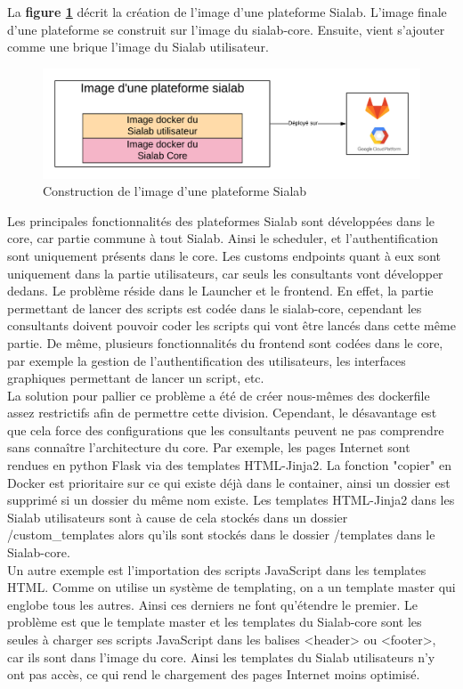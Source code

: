 \documentclass{article} %
\begin{document}
La \textbf{figure \ref{fig:siasia}} décrit la création de l'image d'une plateforme Sialab. L'image finale d'une plateforme se construit sur l'image du sialab-core. Ensuite, vient s'ajouter comme une brique l'image du Sialab utilisateur. 
\begin{figure}[!h]
 \centering
 \includegraphics[keepaspectratio = true,scale=0.6]{sia-core.png}
 \caption{Construction de l'image d'une plateforme Sialab}
 \label{fig:siasia}
\end{figure}

Les principales fonctionnalités des plateformes Sialab sont développées dans le core, car partie commune à tout Sialab. Ainsi le scheduler, et l'authentification sont uniquement présents dans le core. Les customs endpoints quant à eux sont uniquement dans la partie utilisateurs, car seuls les consultants vont développer dedans. Le problème réside dans le Launcher et le frontend. En effet, la partie permettant de lancer des scripts est codée dans le sialab-core, cependant les consultants doivent pouvoir coder les scripts qui vont être lancés dans cette même partie. De même, plusieurs fonctionnalités du frontend sont codées dans le core, par exemple la gestion de l'authentification des utilisateurs, les interfaces graphiques permettant de lancer un script, etc.\\

La solution pour pallier ce problème a été de créer nous-mêmes des dockerfile assez restrictifs afin de permettre cette division. Cependant, le désavantage est que cela force des configurations que les consultants peuvent ne pas comprendre sans connaître l'architecture du core. Par exemple, les pages Internet sont rendues en python Flask via des templates HTML-Jinja2. La fonction "copier" en Docker est prioritaire sur ce qui existe déjà dans le container, ainsi un dossier est supprimé si un dossier du même nom existe. Les templates HTML-Jinja2 dans les Sialab utilisateurs sont à cause de cela stockés dans un dossier /custom\_templates alors qu'ils sont stockés dans le dossier /templates dans le Sialab-core.\\
Un autre exemple est l'importation des scripts JavaScript dans les templates HTML. Comme on utilise un système de templating, on a un template master qui englobe tous les autres. Ainsi ces derniers ne font qu'étendre le premier. Le problème est que le template master et les templates du Sialab-core sont les seules à charger ses scripts JavaScript dans les balises <header> ou <footer>, car ils sont dans l'image du core. Ainsi les templates du Sialab utilisateurs n'y ont pas accès, ce qui rend le chargement des pages Internet moins optimisé.\\
\end{document}
